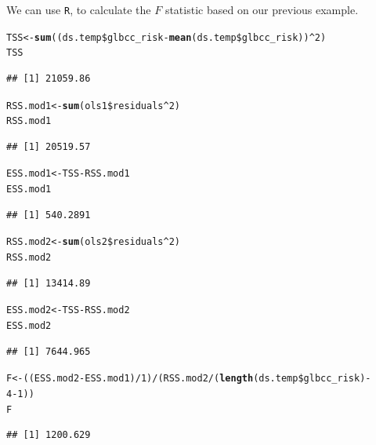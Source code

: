 \documentclass[11pt,openany]{book}\usepackage[]{graphicx}\usepackage[]{color}
\makeatletter
\newcommand{\hlnum}[1]{\textcolor[rgb]{0.686,0.059,0.569}{#1}}%
\newcommand{\hlopt}[1]{\textcolor[rgb]{0,0,0}{#1}}%
\newcommand{\hlstd}[1]{\textcolor[rgb]{0.345,0.345,0.345}{#1}}%
\newcommand{\hlkwb}[1]{\textcolor[rgb]{0.69,0.353,0.396}{#1}}%
\newcommand{\hlkwd}[1]{\textcolor[rgb]{0.737,0.353,0.396}{\textbf{#1}}}%
\newenvironment{kframe}{%
 \def\at@end@of@kframe{}%
 \ifinner\ifhmode%
  \def\at@end@of@kframe{\end{minipage}}%
  \begin{minipage}{\columnwidth}%
 \fi\fi%
 \def\FrameCommand##1{\hskip\@totalleftmargin \hskip-\fboxsep
 \colorbox{shadecolor}{##1}\hskip-\fboxsep
     \hskip-\linewidth \hskip-\@totalleftmargin \hskip\columnwidth}%
 \MakeFramed {\advance\hsize-\width
   \@totalleftmargin\z@ \linewidth\hsize
   \@setminipage}}%
 {\par\unskip\endMakeFramed%
 \at@end@of@kframe}
\newenvironment{knitrout}{}{} %
\renewenvironment{knitrout}{\begin{singlespace}}{\end{singlespace}}
\makeatother
\begin{document}
We can use \texttt{R}, to calculate the $F$ statistic based on our previous example.  
\begin{knitrout}
\color{fgcolor}\begin{kframe}
\begin{alltt}
\hlstd{TSS} \hlkwb{<-} \hlkwd{sum}\hlstd{((ds.temp}\hlopt{\$}\hlstd{glbcc_risk} \hlopt{-} \hlkwd{mean}\hlstd{(ds.temp}\hlopt{\$}\hlstd{glbcc_risk))}\hlopt{^}\hlnum{2}\hlstd{)}
\hlstd{TSS}
\end{alltt}
\begin{verbatim}
## [1] 21059.86
\end{verbatim}
\begin{alltt}
\hlstd{RSS.mod1} \hlkwb{<-} \hlkwd{sum}\hlstd{(ols1}\hlopt{\$}\hlstd{residuals}\hlopt{^}\hlnum{2}\hlstd{)}
\hlstd{RSS.mod1}
\end{alltt}
\begin{verbatim}
## [1] 20519.57
\end{verbatim}
\begin{alltt}
\hlstd{ESS.mod1} \hlkwb{<-} \hlstd{TSS} \hlopt{-} \hlstd{RSS.mod1}
\hlstd{ESS.mod1}
\end{alltt}
\begin{verbatim}
## [1] 540.2891
\end{verbatim}
\begin{alltt}
\hlstd{RSS.mod2} \hlkwb{<-} \hlkwd{sum}\hlstd{(ols2}\hlopt{\$}\hlstd{residuals}\hlopt{^}\hlnum{2}\hlstd{)}
\hlstd{RSS.mod2}
\end{alltt}
\begin{verbatim}
## [1] 13414.89
\end{verbatim}
\begin{alltt}
\hlstd{ESS.mod2} \hlkwb{<-} \hlstd{TSS} \hlopt{-} \hlstd{RSS.mod2}
\hlstd{ESS.mod2}
\end{alltt}
\begin{verbatim}
## [1] 7644.965
\end{verbatim}
\begin{alltt}
\hlstd{F} \hlkwb{<-} \hlstd{((ESS.mod2} \hlopt{-} \hlstd{ESS.mod1)}\hlopt{/}\hlnum{1}\hlstd{)}\hlopt{/}\hlstd{(RSS.mod2}\hlopt{/}\hlstd{(}\hlkwd{length}\hlstd{(ds.temp}\hlopt{\$}\hlstd{glbcc_risk)} \hlopt{-}
    \hlnum{4} \hlopt{-} \hlnum{1}\hlstd{))}
\hlstd{F}
\end{alltt}
\begin{verbatim}
## [1] 1200.629
\end{verbatim}
\end{kframe}
\end{knitrout}
\end{document}

